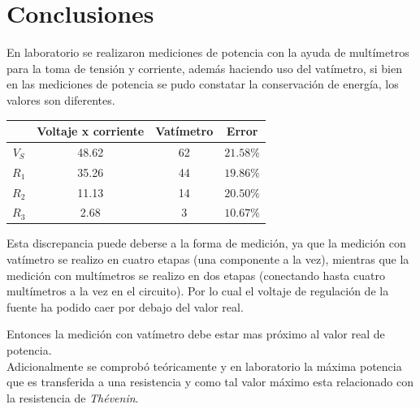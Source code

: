 \documentclass[letter,11pt]{article}
\begin{document}
\section{Conclusiones}
En laboratorio se realizaron mediciones de potencia con la ayuda de multímetros
para la toma de tensión y corriente, además haciendo uso del vatímetro, si bien
en las mediciones de potencia se pudo constatar la conservación de energía, los
valores son diferentes.

\begin{center}
\begin{tabular}{|c|c|c|c|}
\hline
& \textbf{Voltaje x corriente} & \textbf{Vatímetro} & \textbf{Error}
\tabularnewline \hline \hline
$V_S$ & 48.62 & 62 & $21.58\%$ \tabularnewline \hline
$R_1$ & 35.26 & 44 & $19.86\%$ \tabularnewline \hline
$R_2$ & 11.13 & 14 & $20.50\%$ \tabularnewline \hline
$R_3$ &  2.68 &  3 & $10.67\%$ \tabularnewline \hline
\end{tabular}
\end{center}

Esta discrepancia puede deberse a la forma de medición, ya que la medición con
vatímetro se realizo en cuatro etapas (una componente a la vez), mientras que
la medición con multímetros se realizo en dos etapas (conectando hasta cuatro
multímetros a la vez en el circuito). Por lo cual el voltaje de regulación de la
fuente ha podido caer por debajo del valor real.

Entonces la medición con vatímetro debe estar mas próximo al valor real de
potencia.
\\

Adicionalmente se comprobó teóricamente y en laboratorio la máxima potencia
que es transferida a una resistencia y como tal valor máximo esta relacionado
con la resistencia de \emph{Thévenin}.
\end{document}
